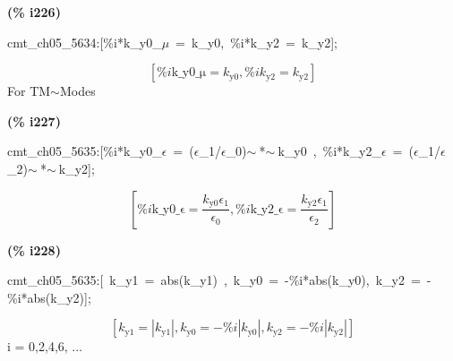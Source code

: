 \documentclass[fleqn]{article}
\begin{document}
\noindent
\begin{minipage}[t]{4.000000em}\color{red}\bfseries
(\% i226)	
\end{minipage}
\begin{minipage}[t]{\textwidth}\color{blue}
cmt\_ch05\_5634:[\%i*k\_y0\_\ensuremath{\mu}\ =\ k\_y0,\ \%i*k\_y2\ =\ k\_y2];
\end{minipage}
\[\displaystyle \tag{\% o226} 
\left[ \% i \ensuremath{\mathrm{k\_ y0\_ \mu }}={k_{\ensuremath{\mathrm{y0}}}}\operatorname{,}\% i {k_{\ensuremath{\mathrm{y2}}}}={k_{\ensuremath{\mathrm{y2}}}}\right] \mbox{}
\]
For TM\ensuremath{\sim }Modes


\noindent
\begin{minipage}[t]{4.000000em}\color{red}\bfseries
(\% i227)	
\end{minipage}
\begin{minipage}[t]{\textwidth}\color{blue}
cmt\_ch05\_5635:[\%i*k\_y0\_\ensuremath{\epsilon}\ =\ (\ensuremath{\epsilon}\_1/\ensuremath{\epsilon}\_0)\ensuremath{\sim\ }*\ensuremath{\sim\ }k\_y0\ ,\ \%i*k\_y2\_\ensuremath{\epsilon}\ =\ (\ensuremath{\epsilon}\_1/\ensuremath{\epsilon}\_2)\ensuremath{\sim\ }*\ensuremath{\sim\ }k\_y2];
\end{minipage}
\[\displaystyle \tag{\% o227} 
\left[ \% i \ensuremath{\mathrm{k\_ y0\_ \epsilon }}=\frac{{k_{\ensuremath{\mathrm{y0}}}} {{\epsilon }_1}}{{{\epsilon }_0}}\operatorname{,}\% i \ensuremath{\mathrm{k\_ y2\_ \epsilon }}=\frac{{k_{\ensuremath{\mathrm{y2}}}} {{\epsilon }_1}}{{{\epsilon }_2}}\right] \mbox{}
\]


\noindent
\begin{minipage}[t]{4.000000em}\color{red}\bfseries
(\% i228)	
\end{minipage}
\begin{minipage}[t]{\textwidth}\color{blue}
cmt\_ch05\_5635:[\ k\_y1\ =\ abs(k\_y1)\ ,\ k\_y0\ =\ -\%i*abs(k\_y0),\ k\_y2\ =\ -\%i*abs(k\_y2)];
\end{minipage}
\[\displaystyle \tag{\% o228} 
\left[ {k_{\ensuremath{\mathrm{y1}}}}=\left| {k_{\ensuremath{\mathrm{y1}}}}\right| \operatorname{,}{k_{\ensuremath{\mathrm{y0}}}}=-\% i \left| {k_{\ensuremath{\mathrm{y0}}}}\right| \operatorname{,}{k_{\ensuremath{\mathrm{y2}}}}=-\% i \left| {k_{\ensuremath{\mathrm{y2}}}}\right| \right] \mbox{}
\]
i = 0,2,4,6, ...
\end{document}
